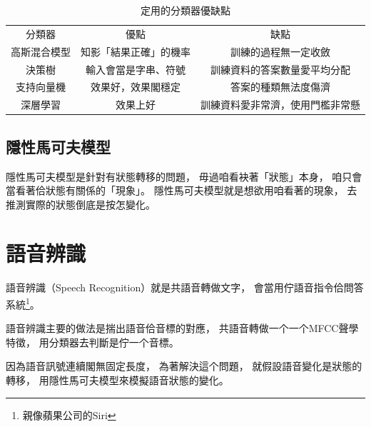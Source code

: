 \begin{table}
\caption{定用的分類器優缺點}
\label{表：定用的分類器優缺點}
\centering
\begin{tabular}{ccc}
分類器 & 優點 & 缺點 \\
高斯混合模型 & 知影「結果正確」的機率 & 訓練的過程無一定收斂 \\
決策樹 & 輸入會當是字串、符號 & 訓練資料的答案數量愛平均分配\\
支持向量機 & 效果好，效果閣穩定 & 答案的種類無法度傷濟\\
深層學習 & 效果上好 & 訓練資料愛非常濟，使用門檻非常懸\\
\end{tabular}
\end{table}
%
%

\subsection{隱性馬可夫模型}
\label{小節：隱性馬可夫模型}
隱性馬可夫模型\cite{隱馬爾可夫模型}是針對有狀態轉移的問題，
毋過咱看袂著「狀態」本身，
咱只會當看著佮狀態有關係的「現象」。
隱性馬可夫模型就是想欲用咱看著的現象，
去推測實際的狀態倒底是按怎變化。



\section{語音辨識}
\label{節：語音辨識}
語音辨識（Speech Recognition）就是共語音轉做文字，
會當用佇語音指令佮問答系統\footnote{親像蘋果公司的Siri}。

語音辨識主要的做法是揣出語音佮音標的對應，
共語音轉做一个一个MFCC聲學特徵，
用分類器去判斷是佇一个音標。

因為語音訊號連續閣無固定長度，
為著解決這个問題，
就假設語音變化是狀態的轉移，
用隱性馬可夫模型來模擬語音狀態的變化。

